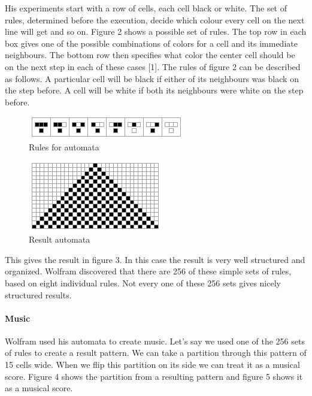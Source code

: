 \documentclass[12pt]{article}
\begin{document}
His experiments start with a row of cells, each cell black or white. The set of rules, determined before the execution, decide which colour every cell on the next line will get and so on. Figure 2 shows a possible set of rules. The top row in each box gives one of the possible combinations of colors for a cell and its immediate neighbours. The bottom row then specifies what color the center cell should be on the next step in each of these cases [1]. The rules of figure 2 can be described as follows. A particular cell will be black if either of its neighbours was black on the step before. A cell will be white if both its neighbours were white on the step before.

\begin{figure}[h]
\centering
\includegraphics[]{img/wolframRules}
\caption{Rules for automata}
\end{figure}

\begin{figure}[h]
\centering
\includegraphics[]{img/wolframResult-15}
\caption{Result automata}
\end{figure}

This gives the result in figure 3. In this case the result is very well structured and organized. Wolfram discovered that there are 256 of these simple sets of rules, based on eight individual rules. Not every one of these 256 sets gives nicely structured results.

\paragraph{Music}

Wolfram used his automata to create music. Let's say we used one of the 256 sets of rules to create a result pattern. We can take a partition through this pattern of 15 cells wide. When we flip this partition on its side we can treat it as a musical score.
Figure 4 shows the partition from a resulting pattern and figure 5 shows it as a musical score.
\newline
\end{document}
